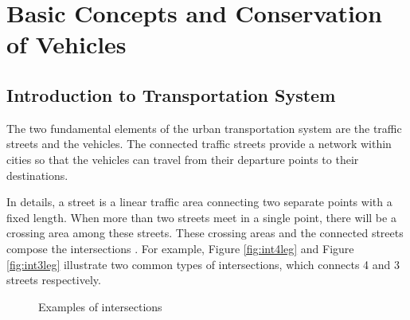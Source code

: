 \documentclass[preprint,authoryear,12pt]{elsarticle}
\begin{document}
\section{Basic Concepts and Conservation of Vehicles}\label{sec:concepts}

\subsection{Introduction to Transportation System}

The two fundamental elements of the urban transportation system are the traffic streets and the vehicles. The connected traffic streets provide a network within cities so that the vehicles can travel from their departure points to their destinations.

In details, a street is a linear traffic area connecting two separate points with a fixed length. When more than two streets meet in a single point, there will be a crossing area among these streets. These crossing areas and the connected streets compose the intersections \citep{papageorgiou_review_2003}. For example, Figure \ref{fig:int4leg} and Figure \ref{fig:int3leg} illustrate two common types of intersections, which connects 4 and 3 streets respectively.

\begin{figure}[ht]
  \centering
  \quad
  \caption{Examples of intersections}
\end{figure}
\end{document}
